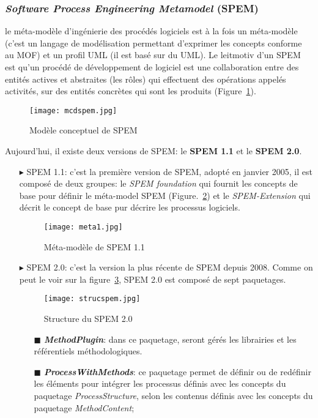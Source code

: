 \begin{itemize}
\subsubsection*{\textit{Software Process Engineering Metamodel} (SPEM)}\label{spemomglabel}
le méta-modèle d'ingénierie des procédés logiciels est à la fois un méta-modèle (c'est un langage de modélisation permettant d'exprimer les concepts conforme au MOF) et un profil UML (il est basé sur du UML). Le leitmotiv d'un SPEM est qu'un procédé de développement de logiciel est une collaboration entre des entités actives et abstraites (les rôles) qui effectuent des opérations appelés activités, sur des entités concrètes qui sont les produits (Figure~\ref{mcpomg}).\\
\begin{figure}[h]
\centering
\texttt{[image: mcdspem.jpg]}
\caption{\label{mcpomg}Modèle conceptuel de SPEM~\cite{omg1}}
\end{figure}
\clearpage
Aujourd'hui, il existe deux versions de SPEM: le \textbf{SPEM 1.1} et le \textbf{SPEM 2.0}.
\begin{itemize}
\item[\tiny{$\blacktriangleright$}] SPEM 1.1: c'est la première version de SPEM, adopté en janvier 2005, il est composé de deux groupes: le \textit{SPEM foundation} qui fournit les concepts de base pour définir le méta-model SPEM (Figure.~\ref{modele}) et le \textit{SPEM-Extension} qui décrit le concept de base pur décrire les processus logiciels. 
\begin{figure}[h] 
\centering
\texttt{[image: meta1.jpg]}
\caption{\label{modele}Méta-modèle de SPEM 1.1~\cite{omg1}}
\end{figure}
\item[\tiny{$\blacktriangleright$}] SPEM 2.0: c'est la version la plus récente de SPEM depuis 2008. Comme on peut le voir sur la figure~\ref{sspem}, SPEM 2.0 est composé de sept paquetages.
\clearpage
\begin{figure}[h]
\centering
\texttt{[image: strucspem.jpg]}
\caption{\label{sspem}Structure du SPEM 2.0~\cite{omg2}}
\end{figure}
\begin{itemize}
\item[\tiny{$\blacksquare$}] \textbf{ \textit{MethodPlugin}}: dans ce paquetage, seront gérés les librairies et les référentiels méthodologiques.
\item[\tiny{$\blacksquare$}] \textbf{ \textit{ProcessWithMethods}}: ce paquetage permet de définir ou de redéfinir les éléments pour intégrer les processus définis avec les concepts du paquetage \textit{ProcessStructure}, selon les contenus définis avec les concepts du paquetage \textit{MethodContent};

\end{itemize}
\end{itemize}
\end{itemize}
